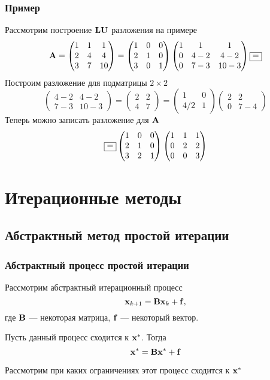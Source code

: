 \documentclass[apectratio=43,unicode]{beamer}
\begin{document}
\begin{frame}\frametitle{Пример}
	Рассмотрим построение $\mathbf{L}\mathbf{U}$ разложения на примере
	\[
	\mathbf{A} =
	\begin{pmatrix}
		1&1&1\\
		2&4&4\\
		3&7&10
	\end{pmatrix} =
	\begin{pmatrix}
		1&0&0\\
		2&1&0\\
		3&0&1
	\end{pmatrix}
	\begin{pmatrix}
		1&1&1\\
		0&4-2&4-2\\
		0&7-3&10-3
	\end{pmatrix}
	\fbox{=}
	\]
	Построим разложение для подматрицы $2\times2$
	\[
	\begin{pmatrix}
		4-2&4-2\\
		7-3&10-3
	\end{pmatrix} =
	\begin{pmatrix}
		2&2\\
		4&7
	\end{pmatrix} =
	\begin{pmatrix}
		1&0\\
		4/2&1
	\end{pmatrix}
	\begin{pmatrix}
		2&2\\
		0&7-4
	\end{pmatrix}
	\]
	Теперь можно записать разложение для $\mathbf{A}$
	\[
	\fbox{=}
	\begin{pmatrix}
		1&0&0\\
		2&1&0\\
		3&2&1
	\end{pmatrix}
	\begin{pmatrix}
		1&1&1\\
		0&2&2\\
		0&0&3
	\end{pmatrix}
	\]
\end{frame}

\section{Итерационные методы}
\subsection{Абстрактный метод простой итерации}
\begin{frame}\frametitle{Абстрактный процесс простой итерации}
	Рассмотрим абстрактный итерационный процесс
	\[
	\mathbf{x}_{k+1} = \mathbf{B} \mathbf{x}_k + \mathbf{f},
	\]
	где $\mathbf{B}$ --- некоторая матрица, $\mathbf{f}$ --- некоторый вектор.

	Пусть данный процесс сходится к $\mathbf{x}^*$. Тогда
	\[
	\mathbf{x}^* = \mathbf{B} \mathbf{x}^* + \mathbf{f}
	\]

	Рассмотрим при каких ограничениях этот процесс сходится к $\mathbf{x}^*$
\end{frame}
\end{document}
